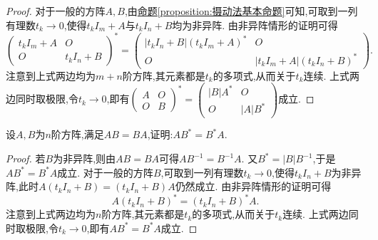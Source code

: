 \documentclass[../../main.tex]{subfiles}
\begin{document}
\begin{proof}
对于一般的方阵\(A,B\),由\hyperref[proposition:摄动法基本命题]{命题\ref{proposition:摄动法基本命题}}可知,可取到一列有理数\(t_k\rightarrow0\),使得\(t_kI_m + A\)与\(t_kI_n + B\)均为非异阵. 由非异阵情形的证明可得
\[
\begin{pmatrix}
t_kI_m + A & O\\
O & t_kI_n + B
\end{pmatrix}^*=\begin{pmatrix}
|t_kI_n + B|(t_kI_m + A)^* & O\\
O & |t_kI_m + A|(t_kI_n + B)^*
\end{pmatrix}.
\]
注意到上式两边均为\(m + n\)阶方阵,其元素都是\(t_k\)的多项式,从而关于\(t_k\)连续. 上式两边同时取极限,令\(t_k\rightarrow0\),即有\(\begin{pmatrix}
A & O\\
O & B
\end{pmatrix}^*=\begin{pmatrix}
|B|A^* & O\\
O & |A|B^*
\end{pmatrix}\)成立.
\end{proof}

\begin{example}
设\(A,B\)为\(n\)阶方阵,满足\(AB = BA\),证明:\(AB^* = B^*A\).
\end{example}
\begin{proof}
若\(B\)为非异阵,则由\(AB = BA\)可得\(AB^{-1}=B^{-1}A\). 又\(B^* = |B|B^{-1}\),于是\(AB^* = B^*A\)成立. 对于一般的方阵\(B\),可取到一列有理数\(t_k\rightarrow0\),使得\(t_kI_n + B\)为非异阵,此时\(A(t_kI_n + B)=(t_kI_n + B)A\)仍然成立. 由非异阵情形的证明可得
\[
A(t_kI_n + B)^*=(t_kI_n + B)^*A.
\]
注意到上式两边均为\(n\)阶方阵,其元素都是\(t_k\)的多项式,从而关于\(t_k\)连续. 上式两边同时取极限,令\(t_k\rightarrow0\),即有\(AB^* = B^*A\)成立.
\end{proof}
\end{document}
